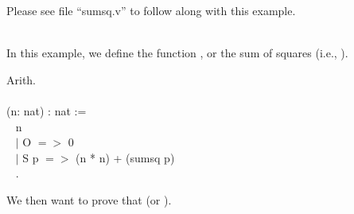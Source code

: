 
Please see file ``sumsq.v'' to follow along with this example. 

~\\
In this example, we define the function , or the sum of squares 
(i.e., ). 



\begin{code}
\Load Arith.
\\ \\ 
\Fixpoint {} (n: nat) : nat := 		\\ \-\ \quad
	\match n \with						\\ \-\ \qquad
	$\mid$ O $=>$ 0					\\ \-\ \qquad
	$\mid$ S p $=>$ (n * n) + (sumsq p)		\\ \-\ \quad
	\End.
\end{code}

\noindent
We then want to prove that  
(or ). 





